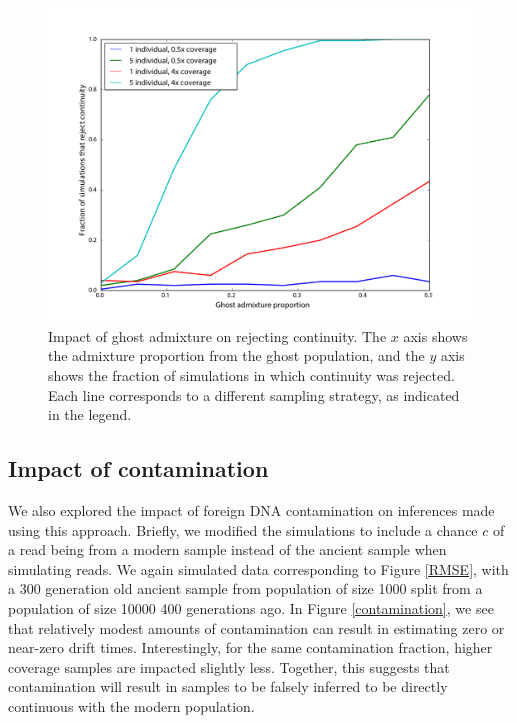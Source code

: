 \documentclass[11pt, oneside]{article}   	%
\begin{document}
\begin{figure}[!h] %
   \centering
   \includegraphics[width=\textwidth]{continuity_rejection_ghost.pdf} 
   \caption{Impact of ghost admixture on rejecting continuity. The $x$ axis shows the admixture proportion from the ghost population, and the $y$ axis shows the fraction of simulations in which continuity was rejected. Each line corresponds to a different sampling strategy, as indicated in the legend.}
   \label{ghost}
\end{figure}

\subsection{Impact of contamination}

We also explored the impact of foreign DNA contamination on inferences made using this approach. Briefly, we modified the simulations to include a chance $c$ of a read being from a modern sample instead of the ancient sample when simulating reads. We again simulated data corresponding to Figure \ref{RMSE}, with a 300 generation old ancient sample from population of size 1000 split from a population of size 10000 400 generations ago. In Figure \ref{contamination}, we see that relatively modest amounts of contamination can result in estimating zero or near-zero drift times. Interestingly, for the same contamination fraction, higher coverage samples are impacted slightly less. Together, this suggests that contamination will result in samples to be falsely inferred to be directly continuous with the modern population.
\end{document}
